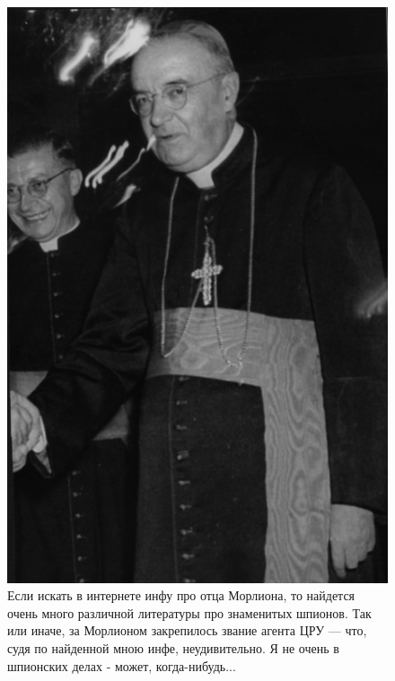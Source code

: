 \begin{figure}[h!tb] 
	\centering\includegraphics[scale=0.5]{Dartmud/yUSfxNuIlFI.jpg}
	\caption{Если искать в интернете инфу про отца Морлиона, то найдется очень много различной литературы про знаменитых шпионов. Так или иначе, за Морлионом закрепилось звание агента ЦРУ — что, судя по найденной мною инфе, неудивительно. Я не очень в шпионских делах - может, когда-нибудь... }%
\end{figure}

